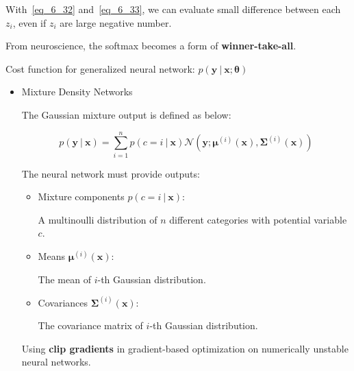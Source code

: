   With~\eqref{eq_6_32} and~\eqref{eq_6_33}, we can evaluate small difference between each $z _ i$, even if $z _ i$ are large negative number.

  From neuroscience, the softmax becomes a form of \textbf{winner-take-all}.


  Cost function for generalized neural network:
  $p( \bm{y} \ |\ \bm{x};\bm{\theta} )$

  \begin{itemize}

%
%

    \item{Mixture Density Networks}

    The Gaussian mixture output is defined as below:

    \begin{equation} \tag{6.35}
      \label{eq_6_35}
      p( \bm{y}\ |\ \bm{x} ) =
        \sum ^ n _ {i=1} p( c=i\ |\ \bm{x} )
        \mathcal{N}( \bm{y}; \bm{\mu} ^ {(i)} (\bm{x}), \bm{\Sigma} ^ {(i)} (\bm{x}) )
    \end{equation}

    The neural network must provide outputs:

    \begin{itemize}

      \item{Mixture components $p(c = i\ |\ \bm{x})$:}

        A multinoulli distribution of $n$ different categories with potential variable $c$.

      \item{Means $\bm{\mu} ^ {(i)} (\bm{x})$:}

        The mean of $i$-th Gaussian distribution.

      \item{Covariances $\bm{\Sigma} ^ {(i)} (\bm{x})$:}

        The covariance matrix of $i$-th Gaussian distribution.

    \end{itemize}

      Using \textbf{clip gradients} in gradient-based optimization on numerically unstable neural networks.


\end{itemize}
